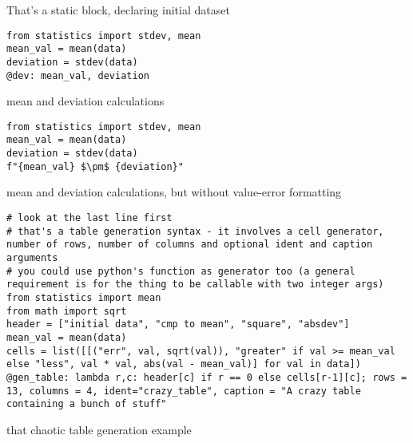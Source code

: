 \documentclass[a4paper]{article}
\begin{document}
That's a static block, declaring initial dataset \\

\begin{verbatim}
from statistics import stdev, mean
mean_val = mean(data)
deviation = stdev(data)
@dev: mean_val, deviation
\end{verbatim}

mean and deviation calculations \\

\begin{verbatim}
from statistics import stdev, mean
mean_val = mean(data)
deviation = stdev(data)
f"{mean_val} $\pm$ {deviation}"
\end{verbatim}

mean and deviation calculations, but without value-error formatting \\

\begin{verbatim}
# look at the last line first
# that's a table generation syntax - it involves a cell generator, number of rows, number of columns and optional ident and caption arguments
# you could use python's function as generator too (a general requirement is for the thing to be callable with two integer args)
from statistics import mean
from math import sqrt
header = ["initial data", "cmp to mean", "square", "absdev"]
mean_val = mean(data)
cells = list([[("err", val, sqrt(val)), "greater" if val >= mean_val else "less", val * val, abs(val - mean_val)] for val in data])
@gen_table: lambda r,c: header[c] if r == 0 else cells[r-1][c]; rows = 13, columns = 4, ident="crazy_table", caption = "A crazy table containing a bunch of stuff"
\end{verbatim}

that chaotic table generation example \\
\end{document}
